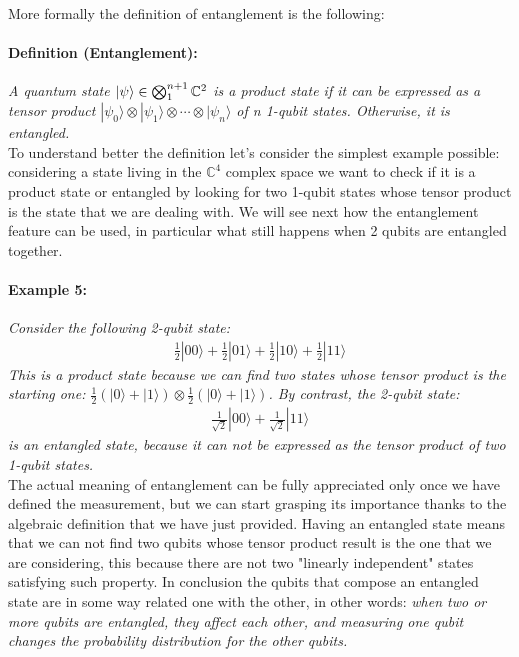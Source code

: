 \documentclass[english]{article}
\newcommand{\sbigotimes}{%
	\mathop{\mathchoice{\textstyle\bigotimes}{\bigotimes}{\bigotimes}{\bigotimes}}%
}
\begin{document}
				More formally the definition of entanglement is the following:
				
				\paragraph{Definition (Entanglement):} \emph{A quantum state $|\psi\rangle \in \sbigotimes_1^{n+1} \mathbb{C}^{2}$ is a product state if it can be expressed as a tensor product $|\psi_0\rangle \otimes |\psi_1\rangle \otimes \cdots \otimes |\psi_n\rangle$ of n 1-qubit states. Otherwise, it is entangled.} \\
				
				To understand better the definition let's consider the simplest example possible: considering a state living in the $\mathbb{C}^4$ complex space we want to check if it is a product state or entangled by looking for two 1-qubit states whose tensor product is the state that we are dealing with. We will see next how the entanglement feature can be used, in particular what still happens when 2 qubits are entangled together.
				
				\paragraph{Example 5:} \emph{Consider the following 2-qubit state:
				\begin{align*}
					\frac{1}{2}|00\rangle+\frac{1}{2}|01\rangle+\frac{1}{2}|10\rangle+\frac{1}{2}|11\rangle
				\end{align*} 
				This is a product state because we can find two states whose tensor product is the starting one: $\frac{1}{2}(|0\rangle+|1\rangle)\otimes\frac{1}{2}(|0\rangle+|1\rangle)$. By contrast, the 2-qubit state:
				\begin{align*}
					\frac{1}{\sqrt{2}}|00\rangle+\frac{1}{\sqrt{2}}|11\rangle
				\end{align*}
				is an entangled state, because it can not be expressed as the tensor product of two 1-qubit states.} \\
			
				The actual meaning of entanglement can be fully appreciated only once we have defined the measurement, but we can start grasping its importance thanks to the algebraic definition that we have just provided. Having an entangled state means that we can not find two qubits whose tensor product result is the one that we are considering, this because there are not two "linearly independent" states satisfying such property. In conclusion the qubits that compose an entangled state are in some way related one with the other, in other words: \emph{when two or more qubits are entangled, they affect each other, and measuring one qubit changes the probability distribution for the other qubits.}
				
\end{document}
